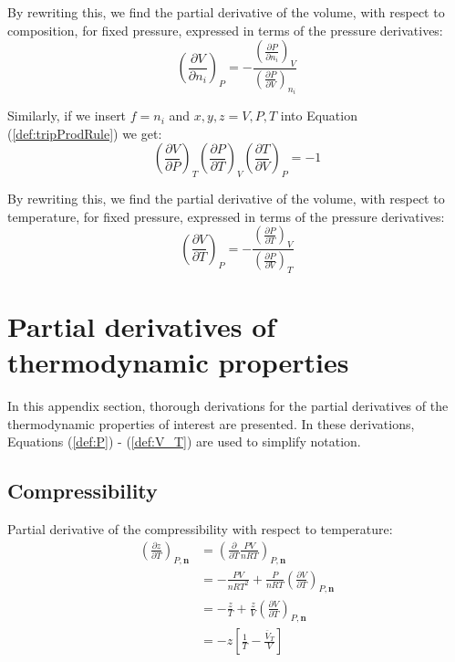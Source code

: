 \documentclass[english]{../thermomemo/thermomemo}
\numberwithin{equation}{section}
\newcommand*{\pder}[2]{\left(\frac{\partial #1}{\partial #2}\right)}
\newcommand*{\reff}[1]{(\ref{#1})}
\begin{document}
By rewriting this, we find the partial derivative of the volume, with respect to composition, for fixed pressure, expressed in terms of the pressure derivatives:
\begin{equation}
\pder{V}{n_i}_P = - \frac{\pder{P}{n_i}_V}{\pder{P}{V}_{n_i}}
\end{equation}

Similarly, if we insert $f = n_i$ and $x,y,z = V,P,T$ into Equation \reff{def:tripProdRule} we get:
\begin{equation}
\pder{V}{P}_{T} \pder{P}{T}_V \pder{T}{V}_P = -1
\end{equation}

By rewriting this, we find the partial derivative of the volume, with respect to temperature, for fixed pressure, expressed in terms of the pressure derivatives:
\begin{equation}
\pder{V}{T}_P = - \frac{\pder{P}{T}_V}{\pder{P}{V}_{T}}
\end{equation}

\section{Partial derivatives of thermodynamic properties}
\label{app:partDerivatives}
In this appendix section, thorough derivations for the partial derivatives of the thermodynamic properties of interest are presented. In these derivations, Equations \reff{def:P} - \reff{def:V_T} are used to simplify notation.
\subsection{Compressibility}
Partial derivative of the compressibility with respect to temperature:
\begin{equation}
\begin{split}
\left( \frac{\partial z}{\partial T} \right)_{P, \textbf{n}}
& = \left( \frac{\partial }{\partial T} \frac{PV}{nRT}\right)_{P, \textbf{n}} \\
& = - \frac{PV}{nRT^2} + \frac{P}{nRT} \left( \frac{\partial V}{\partial T} \right)_{P, \textbf{n}} \\
& = - \frac{z}{T} + \frac{z}{V} \left( \frac{\partial V}{\partial T} \right)_{P, \textbf{n}} \\
& = -z\left[\frac{1}{T} - \frac{\bar{V}_T}{V}\right]
\end{split}
\end{equation}
\end{document}

